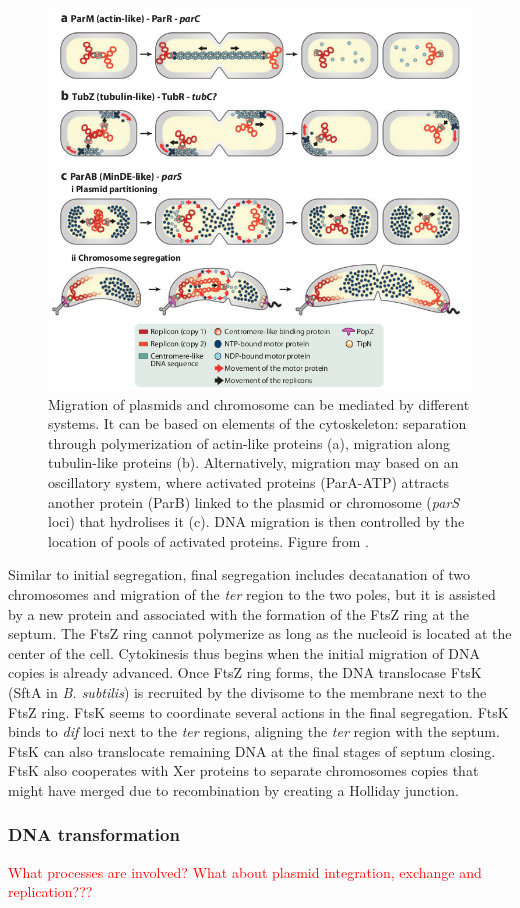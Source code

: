 \begin{figure}[!ht]
	\centering
	\includegraphics[width=0.8\linewidth]{figure/DNAmigration}
	\caption{Migration of plasmids and chromosome can be mediated by different systems. It can be based on elements of the cytoskeleton: separation through polymerization of actin-like proteins (a), migration along tubulin-like proteins (b). Alternatively, migration may based on an oscillatory system, where activated proteins (ParA-ATP) attracts another protein (ParB) linked to the plasmid or chromosome (\textit{parS} loci) that hydrolises it (c). DNA migration is then controlled by the location of pools of activated proteins. Figure from \citet{reyes-lamothe_chromosome_2012}.}
	\label{fig:dnaMigration}
\end{figure}

Similar to initial segregation, final segregation includes decatanation of two chromosomes and migration of the \textit{ter} region to the two poles, but it is assisted by a new protein and associated with the formation of the FtsZ ring at the septum. The FtsZ ring cannot polymerize as long as the nucleoid is located at the center of the cell. Cytokinesis thus begins when the initial migration of DNA copies is already advanced. Once FtsZ ring forms, the DNA translocase FtsK (SftA in \textit{B. subtilis}) is recruited by the divisome to the membrane next to the FtsZ ring. FtsK seems to coordinate several actions in the final segregation. FtsK binds to \textit{dif} loci next to the \textit{ter} regions, aligning the \textit{ter} region with the septum. FtsK can also translocate remaining DNA at the final stages of septum closing. FtsK also cooperates with Xer proteins to separate chromosomes copies that might have merged due to recombination by creating a Holliday junction.
 

\subsubsection{DNA transformation}

\textcolor{red}{What processes are involved?}
\textcolor{red}{What about plasmid integration, exchange and replication???}
